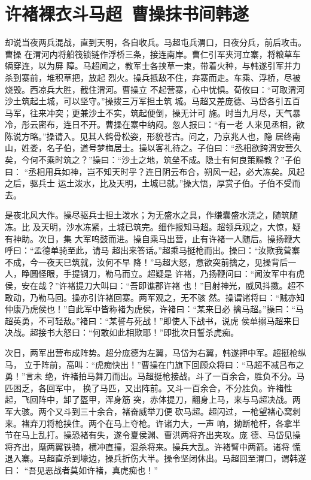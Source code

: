 \chapter{许褚裸衣斗马超~曹操抹书间韩遂}

却说当夜两兵混战，直到天明，各自收兵。马超屯兵渭口，日夜分兵，前后攻击。曹操
在渭河内将船筏锁链作浮桥三条，接连南岸。曹仁引军夹河立寨，将粮草车辆穿连，以为屏
障。马超闻之，教军士各挟草一束，带着火种，与韩遂引军并力杀到寨前，堆积草把，放起
烈火。操兵抵敌不住，弃寨而走。车乘、浮桥，尽被烧毁。西凉兵大胜，截住渭河。曹操立
不起营寨，心中忧惧。荀攸曰：“可取渭河沙土筑起土城，可以坚守。”操拨三万军担土筑
城。马超又差庞德、马岱各引五百马军，往来冲突；更兼沙土不实，筑起便倒，操无计可
施。时当九月尽，天气暴冷，彤云密布，连日不开。曹操在寨中纳闷。忽人报曰：“有一老
人来见丞相，欲陈说方略。”操请入。见其人鹤骨松姿，形貌苍古。问之，乃京兆人也，隐
居终南山，姓娄，名子伯，道号梦梅居士。操以客礼待之。子伯曰：“丞相欲跨渭安营久
矣，今何不乘时筑之？”操曰：“沙土之地，筑垒不成。隐士有何良策赐教？”子伯曰：
“丞相用兵如神，岂不知天时乎？连日阴云布合，朔风一起，必大冻矣。风起之后，驱兵士
运土泼水，比及天明，土城已就。”操大悟，厚赏子伯。子伯不受而去。

是夜北风大作。操尽驱兵士担土泼水；为无盛水之具，作缣囊盛水浇之，随筑随冻。比
及天明，沙水冻紧，土城已筑完。细作报知马超。超领兵观之，大惊，疑有神助。次日，集
大军呜鼓而进。操自乘马出营，止有许褚一人随后。操扬鞭大呼曰：“孟德单骑至此，请马
超出来答话。”超乘马挺枪而出。操曰：“汝欺我营寨不成，今一夜天已筑就，汝何不早
降！”马超大怒，意欲突前擒之，见操背后一人，睁圆怪眼，手提钢刀，勒马而立。超疑是
许褚，乃扬鞭问曰：“闻汝军中有虎侯，安在哉？”许褚提刀大叫曰：“吾即谯郡许褚
也！”目射神光，威风抖擞。超不敢动，乃勒马回。操亦引许褚回寨。两军观之，无不骇
然。操谓诸将曰：“贼亦知仲康乃虎侯也！”自此军中皆称褚为虎侯，许褚曰：“某来日必
擒马超。”操曰：“马超英勇，不可轻敌。”褚曰：“某誓与死战！”即使人下战书，说虎
侯单搦马超来日决战。超接书大怒曰：“何敢如此相欺耶！”即批次日誓杀虎痴。

次日，两军出营布成阵势。超分庞德为左翼，马岱为右翼，韩遂押中军。超挺枪纵马，
立于阵前，高叫：“虎痴快出！”曹操在门旗下回顾众将曰：“马超不减吕布之勇！”言未
绝，许褚拍马舞刀而出。马超挺枪接战。斗了一百余合，胜负不分。马匹困乏，各回军中，
换了马匹，又出阵前。又斗一百余合，不分胜负。许褚性起，飞回阵中，卸了盔甲，浑身筋
突，赤体提刀，翻身上马，来与马超决战。两军大骇。两个又斗到三十余合，褚奋威举刀便
砍马超。超闪过，一枪望褚心窝刺来。褚弃刀将枪挟住。两个在马上夺枪。许诸力大，一声
响，拗断枪杆，各拿半节在马上乱打。操恐褚有失，遂令夏侯渊、曹洪两将齐出夹攻。庞
德、马岱见操将齐出，麾两翼铁骑，横冲直撞，混杀将来。操兵大乱。许褚臂中两箭。诸将
慌退入寨。马超直杀到壕边，操兵折伤大半。操令坚闭休出。马超回至渭口，谓韩遂曰：
“吾见恶战者莫如许褚，真虎痴也！”

